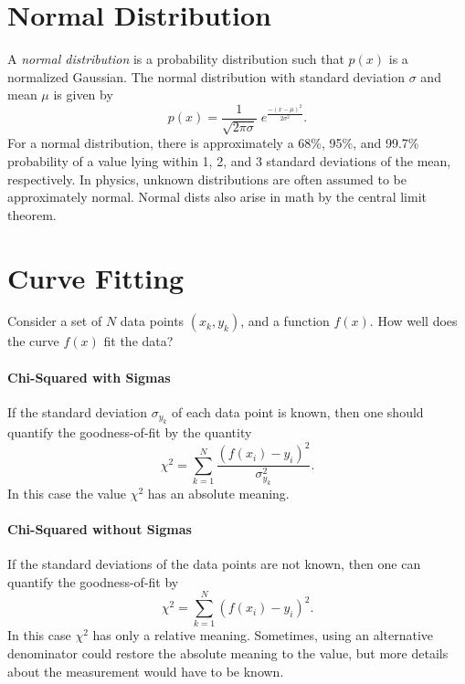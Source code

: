 \documentclass[11pt]{article}
\begin{document}
\section*{Normal Distribution}
A \textit{normal distribution} is a probability distribution such that $p(x)$ is a normalized Gaussian. The normal distribution with standard deviation $\sigma$ and mean $\mu$ is given by
\begin{equation*}
	p(x) = \frac{1}{\sqrt{2\pi\sigma}} \; e^{\frac{-(x-\mu)^2}{2\sigma^2}} .
\end{equation*}
For a normal distribution, there is approximately a 68\%, 95\%, and 99.7\% probability of a value lying within 1, 2, and 3 standard deviations of the mean, respectively. In physics, unknown distributions are often assumed to be approximately normal. Normal dists also arise in math by the central limit theorem.

\clearpage

\section*{Curve Fitting}
Consider a set of $N$ data points $(x_k,y_k)$, and a function $f(x)$. How well does the curve $f(x)$ fit the data?

\paragraph*{Chi-Squared with Sigmas}
If the standard deviation $\sigma_{y_k}$ of each data point is known, then one should quantify the goodness-of-fit by the quantity
\begin{equation*}
\chi^2 = \sum_{k=1}^N \frac{(f(x_i)-y_i)^2}{\sigma_{y_k}^2} . 
\end{equation*}
In this case the value $\chi^2$ has an absolute meaning.

\paragraph*{Chi-Squared without Sigmas}
If the standard deviations of the data points are not known, then one can quantify the goodness-of-fit by
\begin{equation*}
\chi^2 = \sum_{k=1}^N (f(x_i)-y_i)^2 . 
\end{equation*}
In this case $\chi^2$ has only a relative meaning. Sometimes, using an alternative denominator could restore the absolute meaning to the value, but more details about the measurement would have to be known.
\end{document}
